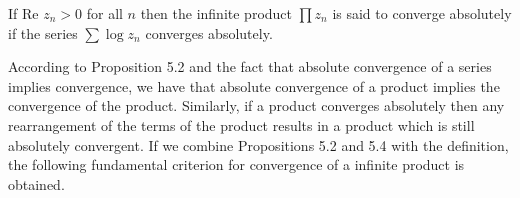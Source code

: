 If $\text{Re } z_n > 0$ for all $n$ then the infinite product $\prod z_n$ is said to converge absolutely if the series $\sum \log z_n$ converges absolutely.

According to Proposition 5.2 and the fact that absolute convergence of a series implies convergence, we have that absolute convergence of a product implies the convergence of the product. Similarly, if a product converges absolutely then any rearrangement of the terms of the product results in a product which is still absolutely convergent. If we combine Propositions 5.2 and 5.4 with the definition, the following fundamental criterion for convergence of a infinite product is obtained.